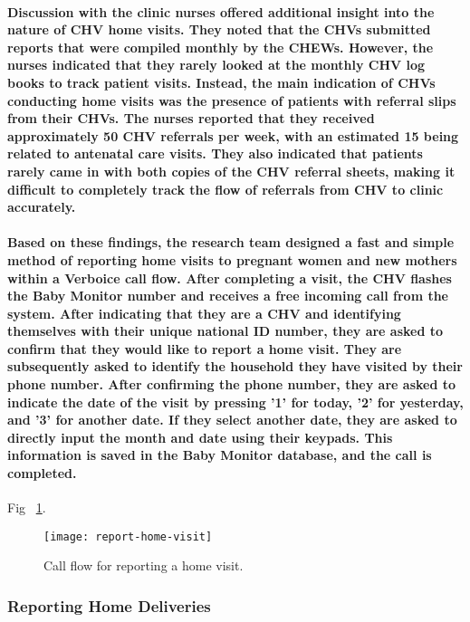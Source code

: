 \paragraph{Discussion with the clinic nurses offered additional insight into the nature of CHV home visits. They noted that the CHVs submitted reports that were compiled monthly by the CHEWs. However, the nurses indicated that they rarely looked at the monthly CHV log books to track patient visits. Instead, the main indication of CHVs conducting home visits was the presence of patients with referral slips from their CHVs. The nurses reported that they received approximately 50 CHV referrals per week, with an estimated 15 being related to antenatal care visits. They also indicated that patients rarely came in with both copies of the CHV referral sheets, making it difficult to completely track the flow of referrals from CHV to clinic accurately.}

\paragraph{Based on these findings, the research team designed a fast and simple method of reporting home visits to pregnant women and new mothers within a Verboice call flow. After completing a visit, the CHV flashes the Baby Monitor number and receives a free incoming call from the system. After indicating that they are a CHV  and identifying themselves with their unique national ID number, they are asked to confirm that they would like to report a home visit. They are subsequently asked to identify the household they have visited by their phone number. After confirming the phone number, they are asked to indicate the date of the visit by pressing '1' for today, '2' for yesterday, and '3' for another date. If they select another date, they are asked to directly input the month and date using their keypads. This information is saved in the Baby Monitor database, and the call is completed.}

Fig ~\ref{fig:homevisit}.
\begin{figure}[]
	\begin{center}
	\texttt{[image: report-home-visit]}
	\end{center}
	\caption{Call flow for reporting a home visit.}
	\label{fig:homevisit}
\end{figure}

\subsubsection{Reporting Home Deliveries}
